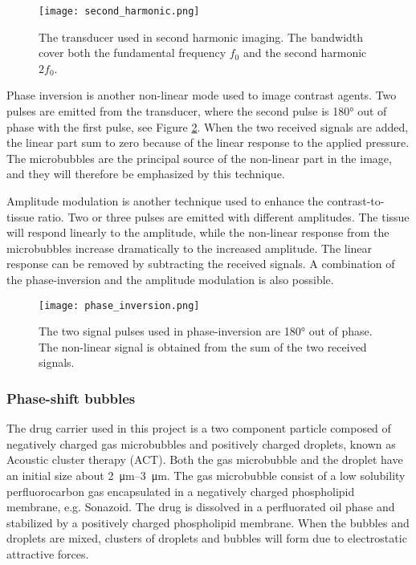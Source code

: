 \begin{figure}[h]
  \centering
  \label{Fig:Second harmonic}
  \texttt{[image: second\_harmonic.png]}
  \caption{The transducer used in second harmonic imaging. The bandwidth cover both the fundamental frequency $f_0$ and the second harmonic $2f_0$\cite{Hoskins2010}.}
\end{figure}
 
Phase inversion is another non-linear mode used to image contrast agents. Two pulses are emitted from the transducer, where the second pulse is \ang{180} out of phase with the first pulse, see Figure \ref{Fig:phase inversion}. When the two received signals are added, the linear part sum to zero because of the linear response to the applied pressure. The microbubbles are the principal source of the non-linear part in the image, and they will therefore be emphasized by this technique.

Amplitude modulation is another technique used to enhance the contrast-to-tissue ratio. Two or three pulses are emitted with different amplitudes. The tissue will respond linearly to the amplitude, while the non-linear response from the microbubbles increase dramatically to the increased amplitude. The linear response can be removed by subtracting the received signals. A combination of the phase-inversion and the amplitude modulation is also possible. 

\begin{figure}[h]
  \centering
  \label{Fig:phase inversion}
  \texttt{[image: phase\_inversion.png]}
  \caption{The two signal pulses used in phase-inversion are \ang{180} out of phase. The non-linear signal is obtained from the sum of the two received signals\cite{Hoskins2010}.}
\end{figure}

\subsubsection{Phase-shift bubbles}
The drug carrier used in this project is a two component particle composed of negatively charged gas microbubbles and positively charged droplets, known as Acoustic cluster therapy (ACT). Both the gas microbubble and the droplet have an initial size about \SIrange{2}{3}{\micro\metre}. The gas microbubble consist of a low solubility perfluorocarbon gas encapsulated in a negatively charged phospholipid membrane, e.g. Sonazoid\texttrademark. The drug is dissolved in a perfluorated oil phase and stabilized by a positively charged phospholipid membrane. When the bubbles and droplets are mixed, clusters of droplets and bubbles will form due to electrostatic attractive forces.


